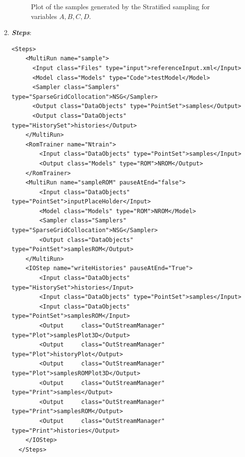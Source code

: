 \begin{enumerate}
\begin{figure}[h!]
  \caption{Plot of the samples generated by the Stratified sampling for variables $A,B,C,D$.}
  \label{fig:historiesSparseGridPlotLine}
 \end{figure}
   \item \textbf{\textit{Steps}}:   
\begin{lstlisting}[style=XML,morekeywords={arg,extension,pauseAtEnd,overwrite}]
  <Steps>
    <MultiRun name="sample">
      <Input class="Files" type="input">referenceInput.xml</Input>
      <Model class="Models" type="Code">testModel</Model>
      <Sampler class="Samplers" type="SparseGridCollocation">NSG</Sampler>
      <Output class="DataObjects" type="PointSet">samples</Output>
      <Output class="DataObjects" type="HistorySet">histories</Output>
    </MultiRun>
    <RomTrainer name="Ntrain">
        <Input class="DataObjects" type="PointSet">samples</Input>
        <Output class="Models" type="ROM">NROM</Output>
    </RomTrainer>
    <MultiRun name="sampleROM" pauseAtEnd="false">
        <Input class="DataObjects" type="PointSet">inputPlaceHolder</Input>
        <Model class="Models" type="ROM">NROM</Model>
        <Sampler class="Samplers" type="SparseGridCollocation">NSG</Sampler>
        <Output class="DataObjects" type="PointSet">samplesROM</Output>
    </MultiRun>
    <IOStep name="writeHistories" pauseAtEnd="True">
        <Input class="DataObjects" type="HistorySet">histories</Input>
        <Input class="DataObjects" type="PointSet">samples</Input>
        <Input class="DataObjects" type="PointSet">samplesROM</Input>
        <Output 	class="OutStreamManager" type="Plot">samplesPlot3D</Output>
        <Output 	class="OutStreamManager" type="Plot">historyPlot</Output>
        <Output 	class="OutStreamManager" type="Plot">samplesROMPlot3D</Output>
        <Output 	class="OutStreamManager" type="Print">samples</Output>
        <Output 	class="OutStreamManager" type="Print">samplesROM</Output>
        <Output 	class="OutStreamManager" type="Print">histories</Output>
    </IOStep>
  </Steps>
\end{lstlisting}
 \begin{figure}[h!]
  \centering

\end{figure}
\end{enumerate}
